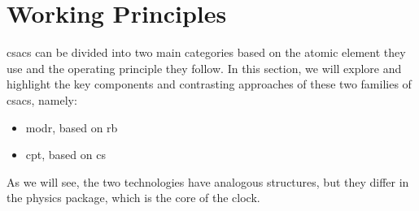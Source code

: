 \section{Working Principles}
\label{sec:working_principles}

\acrfull{csacs} can be divided into two main categories based on the atomic element they use and the operating principle they follow.
In this section, we will explore and highlight the key components and contrasting approaches of these two families of \acrshort{csacs}, namely:

\begin{itemize}
  \item \acrfull{modr}, based on \acrfull{rb}
  \item \acrfull{cpt}, based on \acrfull{cs}
\end{itemize}

As we will see, the two technologies have analogous structures, but they differ in the physics package, which is the core of the clock.

% 
% 

